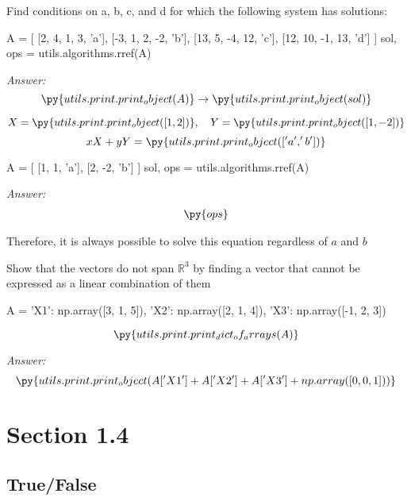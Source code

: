 \documentclass[letterpaper]{article}
\newcommand{\ans}{\textit{Answer: }}
\newenvironment{question}[2][Question]{\begin{trivlist}
\item[\hskip \labelsep {\bfseries #1}\hskip \labelsep {\bfseries #2.}]}{\end{trivlist}}
\newcommand{\printobj}[1]{\py{utils.print.print_object(#1)}}
\begin{document}
\begin{question}{1.69}
    Find conditions on a, b, c, and d for which the following system has solutions:

    \begin{pycode}
A = [
    [2, 4, 1, 3, 'a'],
    [-3, 1, 2, -2, 'b'],
    [13, 5, -4, 12, 'c'],
    [12, 10, -1, 13, 'd']
]
sol, ops = utils.algorithms.rref(A)
    \end{pycode}
    
    \ans 
    $$\printobj{A} \rightarrow \printobj{sol}$$
\end{question}

\begin{question}{1.79}
    $$X = \printobj{[1, 2]}, \quad Y = \printobj{[1, -2]}$$
    $$xX + yY = \printobj{['a', 'b']}$$

    \begin{pycode}
A = [
    [1, 1, 'a'],
    [2, -2, 'b']
]
sol, ops = utils.algorithms.rref(A)
    \end{pycode}
    
    \ans 
    \begin{align*}
        \py{ops}
    \end{align*}

    Therefore, it is always possible to solve this equation regardless of 
    $a$ and $b$
    
\end{question}

\begin{question}{1.80}
    Show that the vectors do not span $\mathbb{R}^3$ by finding a vector that cannot be 
    expressed as a linear combination of them

\begin{pycode}
A = {
    'X1': np.array([3, 1, 5]),
    'X2': np.array([2, 1, 4]),
    'X3': np.array([-1, 2, 3])
}
\end{pycode}

    $$\py{utils.print.print_dict_of_arrays(A)}$$

    \ans 
    $$\printobj{A['X1'] + A['X2'] + A['X3'] + np.array([0, 0, 1])}$$
    
\end{question}

\section{Section 1.4}
\subsection{True/False}
\end{document}
